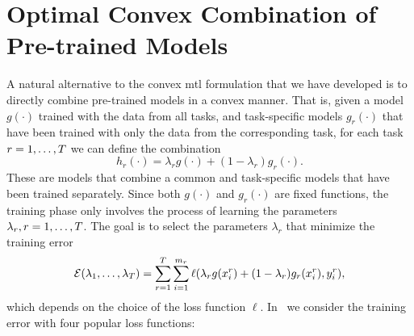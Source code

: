 \section{Optimal Convex Combination of Pre-trained Models}\label{sec:optimal_comb}
A natural alternative to the convex \acrshort{mtl} formulation that we have developed is to directly combine pre-trained models in a convex manner. That is, given a model $g(\cdot)$ trained with the data from all tasks, and task-specific models $g_r(\cdot)$ that have been trained with only the data from the corresponding task, for each task $r=1,\ldots,T$ we can define the combination
\begin{equation}
    \nonumber
    h_r(\cdot) = \lambda_r g(\cdot) + (1 - \lambda_r) g_r(\cdot) .
\end{equation}
These are models that combine a common and task-specific models that have been trained separately. Since both $g(\cdot)$ and $g_r(\cdot)$ are fixed functions, the training phase only involves the process of learning the parameters $\lambda_r, r=1, \ldots, T$. The goal is to select the parameters $\lambda_r$ that minimize the training error
\begin{equation}
    \nonumber
    \mathcal{E}(\lambda_1, \ldots, \lambda_T) = \sum_{r=1}^T \sum_{i=1}^{m_r} \ell(\lambda_r g(x_i^r) + (1 - \lambda_r) g_r(x_i^r), y_i^r) ,
\end{equation}
which depends on the choice of the loss function $\ell$. 
In~\cite{RuizAD21} we consider the training error with four popular loss functions:
